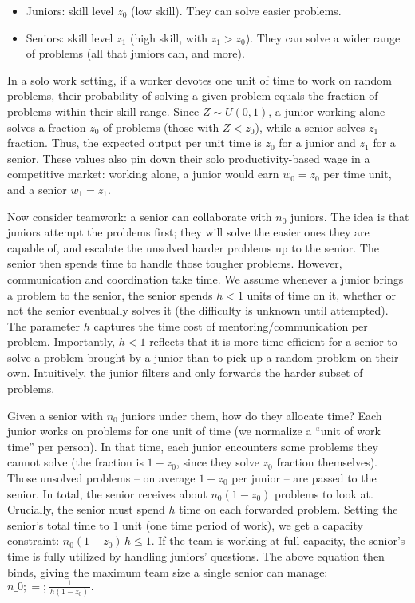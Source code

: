 \documentclass[12pt]{article}
\begin{document}
\begin{itemize}

\item
  {Juniors:} skill level \(z_0\) (low skill). They can solve
  easier problems.
\item
  {Seniors:} skill level \(z_1\) (high skill, with
  \(z_1 > z_0\)). They can solve a wider range of problems (all that
  juniors can, and more).
\end{itemize}

In a {solo work} setting, if a worker devotes one unit of time to
work on random problems, their probability of solving a given problem
equals the fraction of problems within their skill range. Since
\(Z \sim U(0,1)\), a junior working alone solves a fraction \(z_0\) of
problems (those with \(Z < z_0\)), while a senior solves \(z_1\)
fraction. Thus, the {expected output per unit time} is \(z_0\)
for a junior and \(z_1\) for a senior. These values also pin down their
{solo productivity-based wage} in a competitive market: working
alone, a junior would earn \(w_0 = z_0\) per time unit, and a senior
\(w_1 = z_1\).

Now consider {teamwork:} a senior can collaborate with \(n_0\)
juniors. The idea is that juniors attempt the problems first; they will
solve the easier ones they are capable of, and {escalate the
unsolved harder problems up to the senior}. The senior then spends time
to handle those tougher problems. However, communication and
coordination take time. We assume {whenever a junior brings a
problem to the senior, the senior spends \(h < 1\) units of time on it},
whether or not the senior eventually solves it (the difficulty is
unknown until attempted). The parameter \(h\) captures the {time
cost of mentoring/communication per problem}. Importantly, \(h<1\)
reflects that it is more {time-efficient for a senior to solve a
problem brought by a junior} than to pick up a random problem on their
own. Intuitively, the junior filters and only forwards the harder subset
of problems.

Given a senior with \(n_0\) juniors under them, how do they allocate
time? Each junior works on problems for one unit of time (we normalize a
``unit of work time'' per person). In that time, each junior encounters
some problems they cannot solve (the fraction is \(1 - z_0\), since they
solve \(z_0\) fraction themselves). Those unsolved problems -- on
average \(1-z_0\) per junior -- are passed to the senior. In total, the
senior receives about \(n_0 (1 - z_0)\) problems to look at.
{Crucially, the senior must spend \(h\) time on each forwarded
problem.} Setting the senior's total time to 1 unit (one time period of
work), we get a capacity constraint: \(n_0 (1 - z_0)\, h \le 1.\) If the
team is working at full capacity, the senior's time is fully utilized by
handling juniors' questions. The above equation then binds, giving the
{maximum team size} a single senior can manage: $n\_0 ;=;
\frac{1}{\,h(1 - z_0)\,}. \tag{1}$
\end{document}
